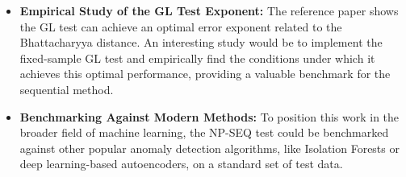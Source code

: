 \begin{itemize}
    \item \textbf{Empirical Study of the GL Test Exponent:} The reference paper \cite{li2014universal} shows the GL test can achieve an optimal error exponent related to the Bhattacharyya distance. An interesting study would be to implement the fixed-sample GL test and empirically find the conditions under which it achieves this optimal performance, providing a valuable benchmark for the sequential method. 
    
    \item \textbf{Benchmarking Against Modern Methods:} To position this work in the broader field of machine learning, the NP-SEQ test could be benchmarked against other popular anomaly detection algorithms, like Isolation Forests or deep learning-based autoencoders, on a standard set of test data.
\end{itemize}
